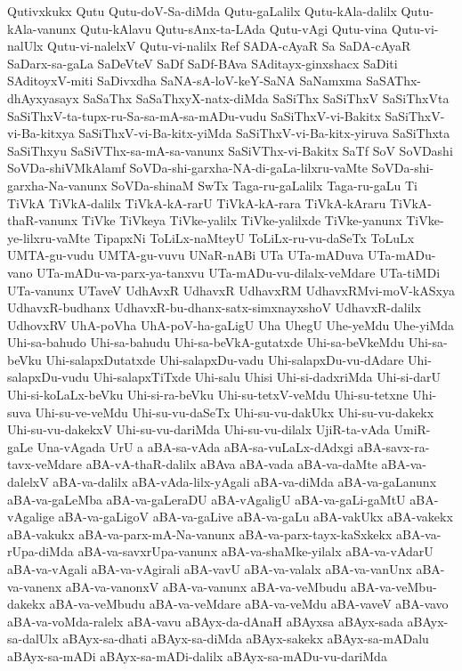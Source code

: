 {Qutivxkukx
Qutu
Qutu-doV-Sa-diMda
Qutu-gaLalilx
Qutu-kAla-dalilx
Qutu-kAla-vanunx
Qutu-kAlavu
Qutu-sAnx-ta-LAda
Qutu-vAgi
Qutu-vina
Qutu-vi-nalUlx
Qutu-vi-nalelxV
Qutu-vi-nalilx
Ref
SADA-cAyaR
Sa
SaDA-cAyaR
SaDarx-sa-gaLa
SaDeVteV
SaDf
SaDf-BAva
SAditayx-ginxshacx
SaDiti
SAditoyxV-miti
SaDivxdha
SaNA-sA-loV-keY-SaNA
SaNamxma
SaSAThx-dhAyxyasayx
SaSaThx
SaSaThxyX-natx-diMda
SaSiThx
SaSiThxV
SaSiThxVta
SaSiThxV-ta-tupx-ru-Sa-sa-mA-sa-mADu-vudu
SaSiThxV-vi-Bakitx
SaSiThxV-vi-Ba-kitxya
SaSiThxV-vi-Ba-kitx-yiMda
SaSiThxV-vi-Ba-kitx-yiruva
SaSiThxta
SaSiThxyu
SaSiVThx-sa-mA-sa-vanunx
SaSiVThx-vi-Bakitx
SaTf
SoV
SoVDashi
SoVDa-shiVMkAlamf
SoVDa-shi-garxha-NA-di-gaLa-lilxru-vaMte
SoVDa-shi-garxha-Na-vanunx
SoVDa-shinaM
SwTx
Taga-ru-gaLalilx
Taga-ru-gaLu
Ti
TiVkA
TiVkA-dalilx
TiVkA-kA-rarU
TiVkA-kA-rara
TiVkA-kAraru
TiVkA-thaR-vanunx
TiVke
TiVkeya
TiVke-yalilx
TiVke-yalilxde
TiVke-yanunx
TiVke-ye-lilxru-vaMte
TipapxNi
ToLiLx-naMteyU
ToLiLx-ru-vu-daSeTx
ToLuLx
UMTA-gu-vudu
UMTA-gu-vuvu
UNaR-nABi
UTa
UTa-mADuva
UTa-mADu-vano
UTa-mADu-va-parx-ya-tanxvu
UTa-mADu-vu-dilalx-veMdare
UTa-tiMDi
UTa-vanunx
UTaveV
UdhAvxR
UdhavxR
UdhavxRM
UdhavxRMvi-moV-kASxya
UdhavxR-budhanx
UdhavxR-bu-dhanx-satx-simxnayxshoV
UdhavxR-dalilx
UdhovxRV
UhA-poVha
UhA-poV-ha-gaLigU
Uha
UhegU
Uhe-yeMdu
Uhe-yiMda
Uhi-sa-bahudo
Uhi-sa-bahudu
Uhi-sa-beVkA-gutatxde
Uhi-sa-beVkeMdu
Uhi-sa-beVku
Uhi-salapxDutatxde
Uhi-salapxDu-vadu
Uhi-salapxDu-vu-dAdare
Uhi-salapxDu-vudu
Uhi-salapxTiTxde
Uhi-salu
Uhisi
Uhi-si-dadxriMda
Uhi-si-darU
Uhi-si-koLaLx-beVku
Uhi-si-ra-beVku
Uhi-su-tetxV-veMdu
Uhi-su-tetxne
Uhi-suva
Uhi-su-ve-veMdu
Uhi-su-vu-daSeTx
Uhi-su-vu-dakUkx
Uhi-su-vu-dakekx
Uhi-su-vu-dakekxV
Uhi-su-vu-dariMda
Uhi-su-vu-dilalx
UjiR-ta-vAda
UmiR-gaLe
Una-vAgada
UrU
a
aBA-sa-vAda
aBA-sa-vuLaLx-dAdxgi
aBA-savx-ra-tavx-veMdare
aBA-vA-thaR-dalilx
aBAva
aBA-vada
aBA-va-daMte
aBA-va-dalelxV
aBA-va-dalilx
aBA-vAda-lilx-yAgali
aBA-va-diMda
aBA-va-gaLanunx
aBA-va-gaLeMba
aBA-va-gaLeraDU
aBA-vAgaligU
aBA-va-gaLi-gaMtU
aBA-vAgalige
aBA-va-gaLigoV
aBA-va-gaLive
aBA-va-gaLu
aBA-vakUkx
aBA-vakekx
aBA-vakukx
aBA-va-parx-mA-Na-vanunx
aBA-va-parx-tayx-kaSxkekx
aBA-va-rUpa-diMda
aBA-va-savxrUpa-vanunx
aBA-va-shaMke-yilalx
aBA-va-vAdarU
aBA-va-vAgali
aBA-va-vAgirali
aBA-vavU
aBA-va-valalx
aBA-va-vanUnx
aBA-va-vanenx
aBA-va-vanonxV
aBA-va-vanunx
aBA-va-veMbudu
aBA-va-veMbu-dakekx
aBA-va-veMbudu
aBA-va-veMdare
aBA-va-veMdu
aBA-vaveV
aBA-vavo
aBA-va-voMda-ralelx
aBA-vavu
aBAyx-da-dAnaH
aBAyxsa
aBAyx-sada
aBAyx-sa-dalUlx
aBAyx-sa-dhati
aBAyx-sa-diMda
aBAyx-sakekx
aBAyx-sa-mADalu
aBAyx-sa-mADi
aBAyx-sa-mADi-dalilx
aBAyx-sa-mADu-vu-dariMda
}
